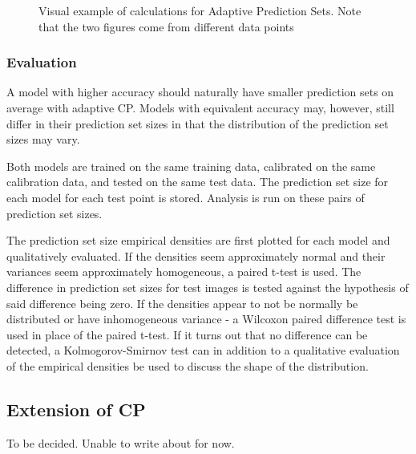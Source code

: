 \begin{figure}
    \caption{Visual example of calculations for Adaptive Prediction Sets. Note that the two figures come from different data points}
\end{figure}


\subsubsection{Evaluation}
A model with higher accuracy should naturally have smaller prediction sets on average with adaptive CP. Models with equivalent accuracy may, however, still differ in their prediction set sizes in that the distribution of the prediction set sizes may vary. 

Both models are trained on the same training data, calibrated on the same calibration data, and tested on the same test data. The prediction set size for each model for each test point is stored. Analysis is run on these pairs of prediction set sizes.

The prediction set size empirical densities are first plotted for each model and qualitatively evaluated. If the densities seem approximately normal and their variances seem approximately homogeneous, a paired t-test is used. The difference in prediction set sizes for test images is tested against the hypothesis of said difference being zero. If the densities appear to not be normally be distributed or have inhomogeneous variance - a Wilcoxon paired difference test is used in place of the paired t-test. If it turns out that no difference can be detected, a Kolmogorov-Smirnov test can in addition to a qualitative evaluation of the empirical densities be used to discuss the shape of the distribution.


\subsection{Extension of CP}
To be decided. Unable to write about for now.